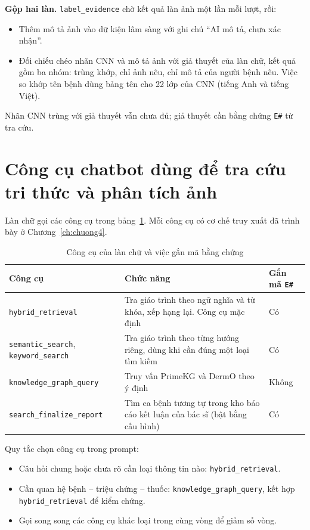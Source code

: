 \textbf{Gộp hai làn.} \texttt{label\_evidence} chờ kết quả làn ảnh một lần mỗi lượt, rồi:
\begin{itemize}
  \item Thêm mô tả ảnh vào dữ kiện lâm sàng với ghi chú ``AI mô tả, chưa xác nhận''.
  \item Đối chiếu chéo nhãn CNN và mô tả ảnh với giả thuyết của làn chữ, kết quả gồm ba nhóm: trùng khớp, chỉ ảnh nêu, chỉ mô tả của người bệnh nêu. Việc so khớp tên bệnh dùng bảng tên cho 22 lớp của CNN (tiếng Anh và tiếng Việt).
\end{itemize}

Nhãn CNN trùng với giả thuyết vẫn chưa đủ; giả thuyết cần bằng chứng \texttt{E\#} từ tra cứu.

\section{Công cụ chatbot dùng để tra cứu tri thức và phân tích ảnh}

Làn chữ gọi các công cụ trong bảng~\ref{tab:cong-cu}. Mỗi công cụ có cơ chế truy xuất đã trình bày ở Chương~\ref{ch:chuong4}.

\begin{table}[H]
\centering
\caption{Công cụ của làn chữ và việc gắn mã bằng chứng}
\label{tab:cong-cu}
\small
\begin{tabular}{|p{4.2cm}|p{6.0cm}|p{3.3cm}|}
\hline
\textbf{Công cụ} & \textbf{Chức năng} & \textbf{Gắn mã \texttt{E\#}} \\ \hline
\texttt{hybrid\_retrieval} & Tra giáo trình theo ngữ nghĩa và từ khóa, xếp hạng lại. Công cụ mặc định & Có \\ \hline
\texttt{semantic\_search}, \texttt{keyword\_search} & Tra giáo trình theo từng hướng riêng, dùng khi cần đúng một loại tìm kiếm & Có \\ \hline
\texttt{knowledge\_graph\_query} & Truy vấn PrimeKG và DermO theo ý định & Không \\ \hline
\texttt{search\_finalize\_report} & Tìm ca bệnh tương tự trong kho báo cáo kết luận của bác sĩ (bật bằng cấu hình) & Có \\ \hline
\end{tabular}
\end{table}

Quy tắc chọn công cụ trong prompt:
\begin{itemize}
  \item Câu hỏi chung hoặc chưa rõ cần loại thông tin nào: \texttt{hybrid\_retrieval}.
  \item Cần quan hệ bệnh -- triệu chứng -- thuốc: \texttt{knowledge\_graph\_query}, kết hợp \texttt{hybrid\_retrieval} để kiểm chứng.
  \item Gọi song song các công cụ khác loại trong cùng vòng để giảm số vòng.
\end{itemize}

